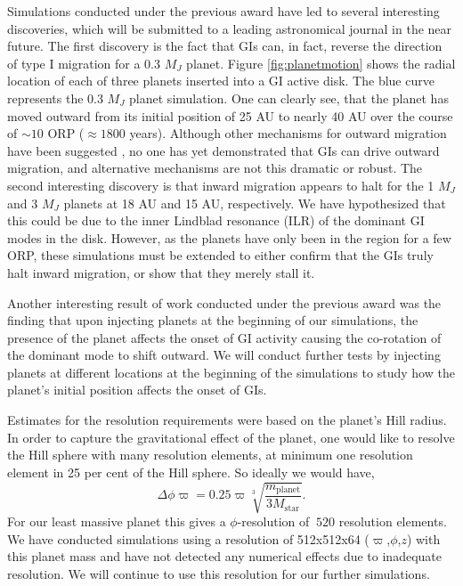 \documentclass[12pt,preprint2]{aastex}
\begin{document}
Simulations conducted under the previous award have led to several interesting discoveries, which will be submitted to a
leading astronomical journal in the near future. The first discovery is the fact that GIs can, in fact, reverse the
direction of type I migration for a 0.3 $M_J$ planet. Figure \ref{fig:planetmotion} shows the radial location of each of
three planets inserted into a GI active disk. The blue curve represents the 0.3 $M_J$ planet simulation. One can clearly
see, that the planet has moved outward from its initial position of 25 AU to nearly 40 AU over the course of $\sim 10$
ORP ($\approx 1800$ years). Although other mechanisms for outward migration have been suggested
\citep{paardekooper2010,paardekooper2011}, no one has yet demonstrated that GIs can drive outward migration, and
alternative mechanisms are not this dramatic or robust. The second interesting discovery is that inward migration
appears to halt for the 1 $M_J$ and 3 $M_J$ planets at 18 AU and 15 AU, respectively. We have hypothesized that this
could be due to the inner Lindblad resonance (ILR) of the dominant GI modes in the disk. However, as the planets have
only been in the region for a few ORP, these simulations must be extended to either confirm that the GIs truly halt
inward migration, or show that they merely stall it.

Another interesting result of work conducted under the previous award was the finding that upon injecting planets at the
beginning of our simulations, the presence of the planet affects the onset of GI activity causing the co-rotation of the
dominant mode to shift outward. We will conduct further tests by injecting planets at different locations at the
beginning of the simulations to study how the planet's initial position affects the onset of GIs.

Estimates for the resolution requirements were based on the planet's Hill radius. In order to capture the gravitational
effect of the planet, one would like to resolve the Hill sphere with many resolution elements, at minimum one resolution
element in 25 per cent of the Hill sphere. So ideally we would have,
\begin{equation}
\Delta \phi \varpi = 0.25\varpi \sqrt[3]{\frac{m_{\mathrm{planet}}}{3M_{\mathrm{star}}}}.
\end{equation}
For our least massive planet this gives a $\phi$-resolution of $~ 520$ resolution elements. We have conducted
simulations using a resolution of 512x512x64 ($\varpi$,$\phi$,$z$) with this planet mass and have not detected any
numerical effects due to inadequate resolution. We will continue to use this resolution for our further simulations.
\end{document}
